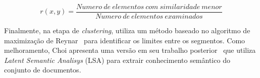 \begin{equation}
r(x,y) = \frac
{Numero\ de\ elementos\ com\ similaridade\ menor}
{Numero\ de\ elementos\ examinados}
\label{equ:ranklocal}
\end{equation}


	
	Finalmente, na etapa de \textit{clustering}, utiliza um método baseado no algoritmo de maximização de Reynar~\cite{Reynar1998} para identificar os limites entre os segmentos. Como melhoramento, Choi apresenta uma versão em seu trabalho posterior~\cite{Choi2001-LSA} que utiliza \textit{Latent Semantic Analisys} (LSA) para extrair conhecimento semântico do conjunto de documentos. 



	
